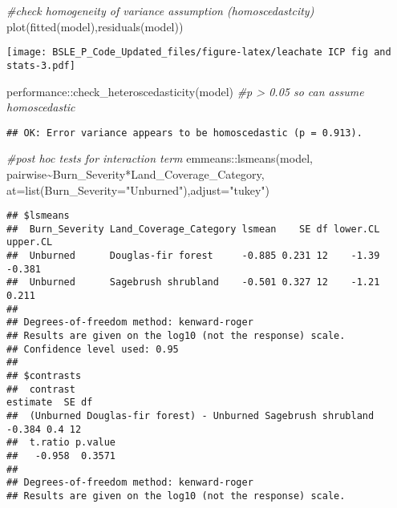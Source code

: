 \documentclass[
]{article}
\newenvironment{Shaded}{\begin{snugshade}}{\end{snugshade}}
\newcommand{\AttributeTok}[1]{\textcolor[rgb]{0.77,0.63,0.00}{#1}}
\newcommand{\CommentTok}[1]{\textcolor[rgb]{0.56,0.35,0.01}{\textit{#1}}}
\newcommand{\FunctionTok}[1]{\textcolor[rgb]{0.00,0.00,0.00}{#1}}
\newcommand{\NormalTok}[1]{#1}
\newcommand{\SpecialCharTok}[1]{\textcolor[rgb]{0.00,0.00,0.00}{#1}}
\newcommand{\StringTok}[1]{\textcolor[rgb]{0.31,0.60,0.02}{#1}}
\begin{document}
\begin{Shaded}
\begin{Highlighting}[]
\CommentTok{\#check homogeneity of variance assumption (homoscedastcity)}
\FunctionTok{plot}\NormalTok{(}\FunctionTok{fitted}\NormalTok{(model),}\FunctionTok{residuals}\NormalTok{(model))}
\end{Highlighting}
\end{Shaded}

\texttt{[image: BSLE\_P\_Code\_Updated\_files/figure-latex/leachate ICP fig and stats-3.pdf]}

\begin{Shaded}
\begin{Highlighting}[]
\NormalTok{performance}\SpecialCharTok{::}\FunctionTok{check\_heteroscedasticity}\NormalTok{(model) }\CommentTok{\#p \textgreater{} 0.05 so can assume homoscedastic}
\end{Highlighting}
\end{Shaded}

\begin{verbatim}
## OK: Error variance appears to be homoscedastic (p = 0.913).
\end{verbatim}

\begin{Shaded}
\begin{Highlighting}[]
\CommentTok{\#post hoc tests for interaction term}
\NormalTok{emmeans}\SpecialCharTok{::}\FunctionTok{lsmeans}\NormalTok{(model, pairwise}\SpecialCharTok{\textasciitilde{}}\NormalTok{Burn\_Severity}\SpecialCharTok{*}\NormalTok{Land\_Coverage\_Category, }\AttributeTok{at=}\FunctionTok{list}\NormalTok{(}\AttributeTok{Burn\_Severity=}\StringTok{"Unburned"}\NormalTok{),}\AttributeTok{adjust=}\StringTok{"tukey"}\NormalTok{) }
\end{Highlighting}
\end{Shaded}

\begin{verbatim}
## $lsmeans
##  Burn_Severity Land_Coverage_Category lsmean    SE df lower.CL upper.CL
##  Unburned      Douglas-fir forest     -0.885 0.231 12    -1.39   -0.381
##  Unburned      Sagebrush shrubland    -0.501 0.327 12    -1.21    0.211
## 
## Degrees-of-freedom method: kenward-roger 
## Results are given on the log10 (not the response) scale. 
## Confidence level used: 0.95 
## 
## $contrasts
##  contrast                                                     estimate  SE df
##  (Unburned Douglas-fir forest) - Unburned Sagebrush shrubland   -0.384 0.4 12
##  t.ratio p.value
##   -0.958  0.3571
## 
## Degrees-of-freedom method: kenward-roger 
## Results are given on the log10 (not the response) scale.
\end{verbatim}
\end{document}

